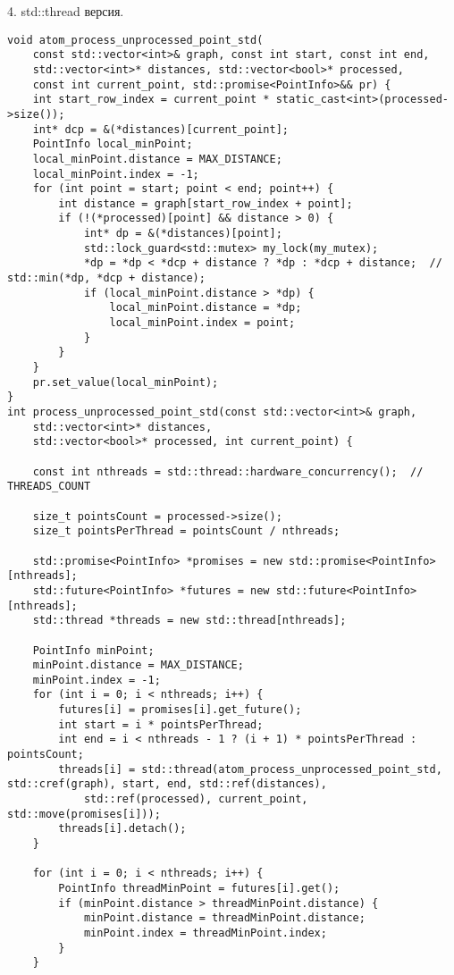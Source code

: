 \documentclass{report}
\begin{document}
\par 4. std::thread версия.
\begin{lstlisting}
void atom_process_unprocessed_point_std(
    const std::vector<int>& graph, const int start, const int end,
    std::vector<int>* distances, std::vector<bool>* processed,
    const int current_point, std::promise<PointInfo>&& pr) {
    int start_row_index = current_point * static_cast<int>(processed->size());
    int* dcp = &(*distances)[current_point];
    PointInfo local_minPoint;
    local_minPoint.distance = MAX_DISTANCE;
    local_minPoint.index = -1;
    for (int point = start; point < end; point++) {
        int distance = graph[start_row_index + point];
        if (!(*processed)[point] && distance > 0) {
            int* dp = &(*distances)[point];
            std::lock_guard<std::mutex> my_lock(my_mutex);
            *dp = *dp < *dcp + distance ? *dp : *dcp + distance;  // std::min(*dp, *dcp + distance);
            if (local_minPoint.distance > *dp) {
                local_minPoint.distance = *dp;
                local_minPoint.index = point;
            }
        }
    }
    pr.set_value(local_minPoint);
}
int process_unprocessed_point_std(const std::vector<int>& graph,
    std::vector<int>* distances,
    std::vector<bool>* processed, int current_point) {

    const int nthreads = std::thread::hardware_concurrency();  //  THREADS_COUNT

    size_t pointsCount = processed->size();
    size_t pointsPerThread = pointsCount / nthreads;

    std::promise<PointInfo> *promises = new std::promise<PointInfo>[nthreads];
    std::future<PointInfo> *futures = new std::future<PointInfo>[nthreads];
    std::thread *threads = new std::thread[nthreads];

    PointInfo minPoint;
    minPoint.distance = MAX_DISTANCE;
    minPoint.index = -1;
    for (int i = 0; i < nthreads; i++) {
        futures[i] = promises[i].get_future();
        int start = i * pointsPerThread;
        int end = i < nthreads - 1 ? (i + 1) * pointsPerThread : pointsCount;
        threads[i] = std::thread(atom_process_unprocessed_point_std, std::cref(graph), start, end, std::ref(distances),
            std::ref(processed), current_point, std::move(promises[i]));
        threads[i].detach();
    }

    for (int i = 0; i < nthreads; i++) {
        PointInfo threadMinPoint = futures[i].get();
        if (minPoint.distance > threadMinPoint.distance) {
            minPoint.distance = threadMinPoint.distance;
            minPoint.index = threadMinPoint.index;
        }
    }


\end{lstlisting}
\end{document}
